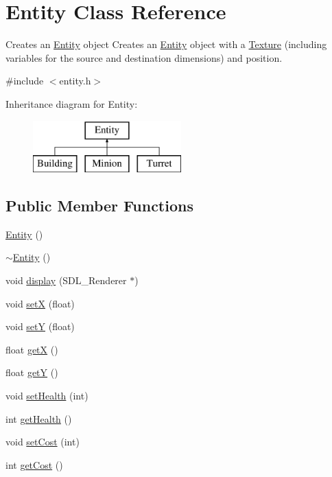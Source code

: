 \hypertarget{class_entity}{\section{Entity Class Reference}
\label{class_entity}
}


Creates an \hyperlink{class_entity}{Entity} object Creates an \hyperlink{class_entity}{Entity} object with a \hyperlink{class_texture}{Texture} (including variables for the source and destination dimensions) and position.  




{\ttfamily \#include $<$entity.\+h$>$}

Inheritance diagram for Entity\+:\begin{figure}[H]
\begin{center}
\leavevmode
\includegraphics[height=2.000000cm]{class_entity}
\end{center}
\end{figure}
\subsection*{Public Member Functions}
\begin{DoxyCompactItemize}
\item 
\hyperlink{class_entity_a980f368aa07ce358583982821533a54a}{Entity} ()
\item 
\hyperlink{class_entity_adf6d3f7cb1b2ba029b6b048a395cc8ae}{$\sim$\+Entity} ()
\item 
void \hyperlink{class_entity_a2224871711ac97a54af338ddefc25ac9}{display} (S\+D\+L\+\_\+\+Renderer $\ast$)
\item 
void \hyperlink{class_entity_a38e2f110d39426ba4823296b4294dd74}{set\+X} (float)
\item 
void \hyperlink{class_entity_a8896110a266bdec69b14d34ec6374df8}{set\+Y} (float)
\item 
float \hyperlink{class_entity_abc5b6d26c039bf3bf6faa766990768b4}{get\+X} ()
\item 
float \hyperlink{class_entity_ab6dd7b404c13754202acfe3d2c65c77b}{get\+Y} ()
\item 
void \hyperlink{class_entity_a0c4ef1c69d6054cebf71445d98bb3afc}{set\+Health} (int)
\item 
int \hyperlink{class_entity_a2b0140ae8c77c0e3654b070ee3c7fe57}{get\+Health} ()
\item 
void \hyperlink{class_entity_a008de3cd38f0a2d2533c3384e54569cc}{set\+Cost} (int)
\item 
int \hyperlink{class_entity_a57cbd6215579c3181414c352a920ba10}{get\+Cost} ()
\end{DoxyCompactItemize}
